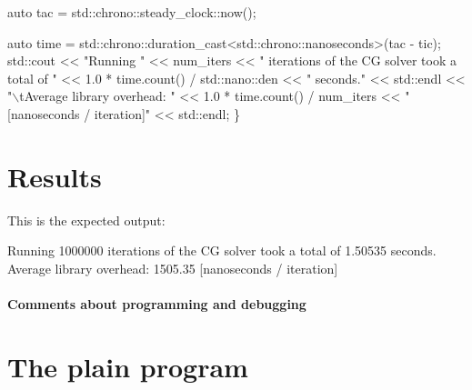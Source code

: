 \begin{DoxyCode}
    \textcolor{keyword}{auto} tac = std::chrono::steady\_clock::now();

    \textcolor{keyword}{auto} time = std::chrono::duration\_cast<std::chrono::nanoseconds>(tac - tic);
    std::cout << \textcolor{stringliteral}{"Running "} << num\_iters
              << \textcolor{stringliteral}{" iterations of the CG solver took a total of "}
              << 1.0 * time.count() / std::nano::den << \textcolor{stringliteral}{" seconds."} << std::endl
              << \textcolor{stringliteral}{"\(\backslash\)tAverage library overhead:     "}
              << 1.0 * time.count() / num\_iters << \textcolor{stringliteral}{" [nanoseconds / iteration]"}
              << std::endl;
\}
\end{DoxyCode}
 \label{_Results}%
\section*{Results}

This is the expected output\+:


\begin{DoxyCode}
Running 1000000 iterations of the CG solver took a total of 1.50535 seconds.
        Average library overhead:     1505.35 [nanoseconds / iteration]
\end{DoxyCode}


\label{_Commentsaboutprogramminganddebugging}%
\paragraph*{Comments about programming and debugging }

\label{_PlainProg}%
 \section*{The plain program}


